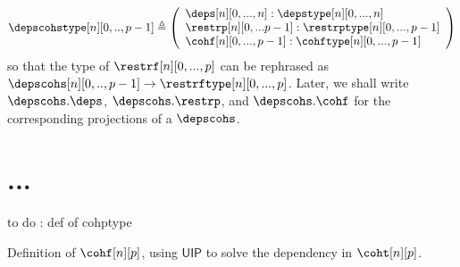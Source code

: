 \documentclass{msc}
\newcommand{\defeq}{\ensuremath{\triangleq}}
\newcommand{\UIP}{\textsf{UIP}}
\begin{document}
\begin{align*}
  \depscohstype[n][0,..,p-1] \defeq
  \left(\begin{array}{l}
            \deps[n][0,...,n] :\depstype[n][0,...,n]        \\
            \restrp[n][0,...p-1]: \restrptype[n][0,...,p-1] \\
            \cohf[n][0,...,p-1]: \cohftype[n][0,...,p-1]    \\
          \end{array}\right)
\end{align*}
so that the type of $\restrf[n][0,...,p]$ can be rephrased as $\depscohs[n][0,..,p-1] \rightarrow \restrftype[n][0,...,p]$. Later, we shall write $\depscohs.\deps$, $\depscohs.\restrp$, and $\depscohs.\cohf$ for the corresponding projections of a $\depscohs$.

\section{...}

to do : def of cohptype

Definition of $\cohf[n][p]$, using $\UIP$ to solve the dependency in $\coht[n][p]$.
\end{document}
